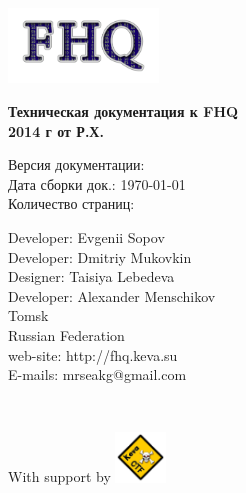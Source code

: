 \begin{titlepage}

\noindent
\begin{flushright}
\includegraphics[width=0.3\textwidth]{./img/logo}~
\\[3cm]

\end{flushright}
\begin{center}
{ \huge \bfseries Техническая документация к FHQ \\ 2014 г от Р.Х.\\[2cm] }
\end{center}

\noindent
\begin{minipage}{0.4\textwidth}
\begin{flushleft}
Версия документации:  \\
Дата сборки док.: \today \\
Количество страниц: \pageref{LastPage} \\
\end{flushleft}
\end{minipage}%

\vfill


\noindent
\begin{minipage}{0.5\textwidth}
\begin{flushleft}
Developer: Evgenii Sopov \\
Developer: Dmitriy Mukovkin \\
Designer: Taisiya Lebedeva \\
Developer: Alexander Menschikov \\
Tomsk \\
Russian Federation \\[0.4cm]
web-site: http://fhq.keva.su \\
E-mails: mrseakg@gmail.com
\end{flushleft}
\end{minipage}%
\\[1cm]

\noindent

\begin{minipage}{1.0\textwidth}
\begin{flushright}
With support by
\includegraphics[width=0.1\textwidth]{./img/keva}~
\end{flushright}
\end{minipage}%


\end{titlepage}